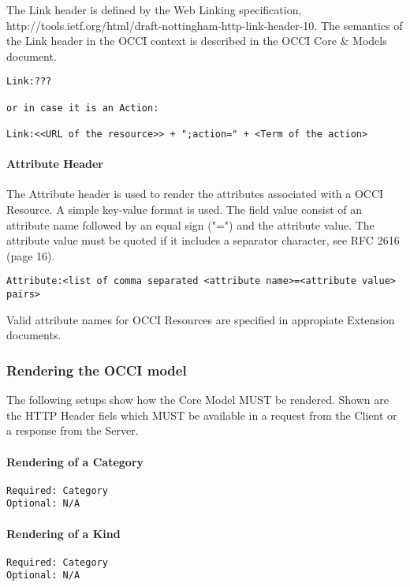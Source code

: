 \documentclass[10pt,a4paper]{article}
\begin{document}
The Link header is defined by the Web Linking specification, http://tools.ietf.org/html/draft-nottingham-http-link-header-10. The semantics of the Link header in the OCCI context is described in the OCCI Core \& Models document.

\begin{verbatim}
Link:???

or in case it is an Action:

Link:<<URL of the resource>> + ";action=" + <Term of the action>
\end{verbatim}

\paragraph{Attribute Header}

The Attribute header is used to render the attributes associated with a OCCI Resource. A simple key-value format is used. The field value consist of an attribute name followed by an equal sign ("=") and the attribute value. The attribute value must be quoted if it includes a separator character, see RFC 2616 (page 16).

\begin{verbatim}
Attribute:<list of comma separated <attribute name>=<attribute value> pairs>
\end{verbatim}

Valid attribute names for OCCI Resources are specified in appropiate Extension documents.

\subsubsection{Rendering the OCCI model}

The following setups show how the Core Model MUST be rendered. Shown are the HTTP Header fiels which MUST be available in a request from the Client or a response from the Server.

\paragraph{Rendering of a Category}
\begin{verbatim}
Required: Category
Optional: N/A
\end{verbatim}

\paragraph{Rendering of a Kind}
\begin{verbatim}
Required: Category
Optional: N/A
\end{verbatim}
\end{document}
